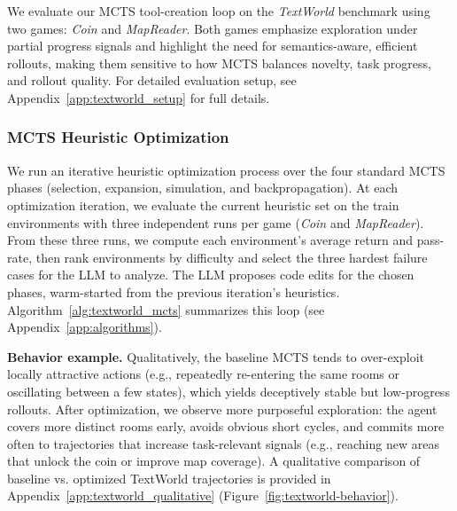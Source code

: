 \documentclass{article}
\begin{document}

\label{sec:textworld_env}
We evaluate our MCTS tool-creation loop on the \textit{TextWorld} benchmark using two games: \textit{Coin} and \textit{MapReader}. Both games emphasize exploration under partial progress signals and highlight the need for semantics-aware, efficient rollouts, making them sensitive to how MCTS balances novelty, task progress, and rollout quality. For detailed evaluation setup, see Appendix~\ref{app:textworld_setup} for full details.

\subsubsection{MCTS Heuristic Optimization}
We run an iterative heuristic optimization process over the four standard MCTS phases (selection, expansion, simulation, and backpropagation). At each optimization iteration, we evaluate the current heuristic set on the train environments with three independent runs per game (\textit{Coin} and \textit{MapReader}). From these three runs, we compute each environment's average return and pass-rate, then rank environments by difficulty and select the three hardest failure cases for the LLM to analyze. The LLM proposes code edits for the chosen phases, warm-started from the previous iteration's heuristics. Algorithm~\ref{alg:textworld_mcts} summarizes this loop (see Appendix~\ref{app:algorithms}).

\textbf{Behavior example.}
Qualitatively, the baseline MCTS tends to over-exploit locally attractive actions (e.g., repeatedly re-entering the same rooms or oscillating between a few states), which yields deceptively stable but low-progress rollouts. After optimization, we observe more purposeful exploration: the agent covers more distinct rooms early, avoids obvious short cycles, and commits more often to trajectories that increase task-relevant signals (e.g., reaching new areas that unlock the coin or improve map coverage). A qualitative comparison of baseline vs. optimized TextWorld trajectories is provided in Appendix~\ref{app:textworld_qualitative} (Figure~\ref{fig:textworld-behavior}).
\end{document}
